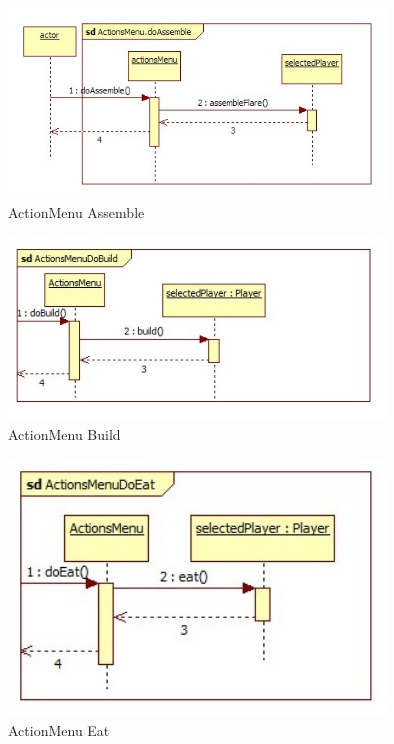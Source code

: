 \begin{figure}[H]
	\begin{center}
		\includegraphics[width=10cm]{chapters/chapter11/seq/ActionsMenu_doAssemble.jpg}
		\caption{ActionMenu Assemble}
		\label{ActionMenu Assemble}
	\end{center}
\end{figure}
\begin{figure}[H]
	\begin{center}
		\includegraphics[width=10cm]{chapters/chapter11/seq/ActionsMenu_DoBuild.jpg}
		\caption{ActionMenu Build}
		\label{ActionMenu Build}
	\end{center}
\end{figure}
\begin{figure}[H]
	\begin{center}
		\includegraphics[width=10cm]{chapters/chapter11/seq/ActionsMenu_DoEat.jpg}
		\caption{ActionMenu Eat}
		\label{ActionMenu Eat}
	\end{center}
\end{figure}
